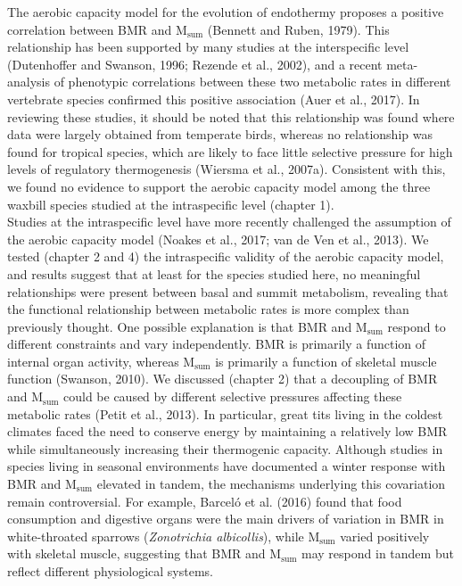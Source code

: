 \documentclass[10pt, twoside]{book} %
\begin{document}
The aerobic capacity model for the evolution of endothermy proposes a positive correlation between BMR and M$_{\text{sum}}$ (Bennett and Ruben, 1979). This relationship has been supported by many studies at the interspecific level (Dutenhoffer and Swanson, 1996; Rezende et al., 2002), and a recent meta-analysis of phenotypic correlations between these two metabolic rates in different vertebrate species confirmed this positive association (Auer et al., 2017). In reviewing these studies, it should be noted that this relationship was found where data were largely obtained from temperate birds, whereas no relationship was found for tropical species, which are likely to face little selective pressure for high levels of regulatory thermogenesis (Wiersma et al., 2007a). Consistent with this, we found no evidence to support the aerobic capacity model among the three waxbill species studied at the intraspecific level (chapter 1).\\

Studies at the intraspecific level have more recently challenged the assumption of the aerobic capacity model (Noakes et al., 2017; van de Ven et al., 2013). We tested (chapter 2 and 4) the intraspecific validity of the aerobic capacity model, and results suggest that at least for the species studied here, no meaningful relationships were present between basal and summit metabolism, revealing that the functional relationship between metabolic rates is more complex than previously thought. One possible explanation is that BMR and M$_{\text{sum}}$ respond to different constraints and vary independently. BMR is primarily a function of internal organ activity, whereas M$_{\text{sum}}$ is primarily a function of skeletal muscle function (Swanson, 2010). We discussed (chapter 2) that a decoupling of BMR and M$_{\text{sum}}$ could be caused by different selective pressures affecting these metabolic rates (Petit et al., 2013). In particular, great tits living in the coldest climates faced the need to conserve energy by maintaining a relatively low BMR while simultaneously increasing their thermogenic capacity. Although studies in species living in seasonal environments have documented a winter response with BMR and M$_{\text{sum}}$ elevated in tandem, the mechanisms underlying this covariation remain controversial. For example, Barceló et al. (2016) found that food consumption and digestive organs were the main drivers of variation in BMR in white-throated sparrows (\textit{Zonotrichia albicollis}), while M$_{\text{sum}}$ varied positively with skeletal muscle, suggesting that BMR and M$_{\text{sum}}$ may respond in tandem but reflect different physiological systems. \\
\end{document}
